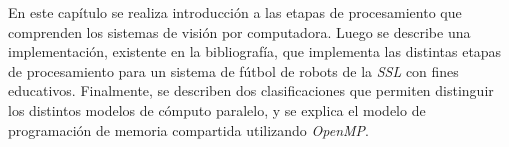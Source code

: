
En este capítulo se realiza introducción a las etapas de procesamiento que
comprenden los sistemas de visión por computadora. Luego se describe una
implementación, existente en la bibliografía, que implementa las distintas
etapas de procesamiento para un sistema de fútbol de robots de la \emph{SSL} con
fines educativos. Finalmente, se describen dos clasificaciones que permiten
distinguir los distintos modelos de cómputo paralelo, y se explica el modelo de
programación de memoria compartida utilizando \emph{OpenMP}.
